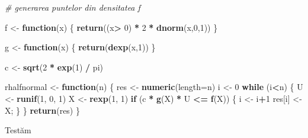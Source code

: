 \documentclass[]{article}
\newenvironment{Shaded}{\begin{snugshade}}{\end{snugshade}}
\newcommand{\CommentTok}[1]{\textcolor[rgb]{0.56,0.35,0.01}{\textit{#1}}}
\newcommand{\ControlFlowTok}[1]{\textcolor[rgb]{0.13,0.29,0.53}{\textbf{#1}}}
\newcommand{\DataTypeTok}[1]{\textcolor[rgb]{0.13,0.29,0.53}{#1}}
\newcommand{\DecValTok}[1]{\textcolor[rgb]{0.00,0.00,0.81}{#1}}
\newcommand{\KeywordTok}[1]{\textcolor[rgb]{0.13,0.29,0.53}{\textbf{#1}}}
\newcommand{\NormalTok}[1]{#1}
\newcommand{\OperatorTok}[1]{\textcolor[rgb]{0.81,0.36,0.00}{\textbf{#1}}}
\newcommand{\StringTok}[1]{\textcolor[rgb]{0.31,0.60,0.02}{#1}}
\begin{document}
\begin{Shaded}
\begin{Highlighting}[]
\CommentTok{# generarea puntelor din densitatea f}

\NormalTok{f <-}\StringTok{ }\ControlFlowTok{function}\NormalTok{(x) \{}
  \KeywordTok{return}\NormalTok{((x}\OperatorTok{>}\StringTok{ }\DecValTok{0}\NormalTok{) }\OperatorTok{*}\StringTok{ }\DecValTok{2} \OperatorTok{*}\StringTok{ }\KeywordTok{dnorm}\NormalTok{(x,}\DecValTok{0}\NormalTok{,}\DecValTok{1}\NormalTok{))}
\NormalTok{\}}

\NormalTok{g <-}\StringTok{ }\ControlFlowTok{function}\NormalTok{(x) \{ }\KeywordTok{return}\NormalTok{(}\KeywordTok{dexp}\NormalTok{(x,}\DecValTok{1}\NormalTok{)) \}}

\NormalTok{c <-}\StringTok{ }\KeywordTok{sqrt}\NormalTok{(}\DecValTok{2} \OperatorTok{*}\StringTok{ }\KeywordTok{exp}\NormalTok{(}\DecValTok{1}\NormalTok{) }\OperatorTok{/}\StringTok{ }\NormalTok{pi)}

\NormalTok{rhalfnormal <-}\StringTok{ }\ControlFlowTok{function}\NormalTok{(n) \{}
\NormalTok{  res <-}\StringTok{ }\KeywordTok{numeric}\NormalTok{(}\DataTypeTok{length=}\NormalTok{n)}
\NormalTok{  i <-}\StringTok{ }\DecValTok{0}
  \ControlFlowTok{while}\NormalTok{ (i}\OperatorTok{<}\NormalTok{n) \{}
\NormalTok{    U <-}\StringTok{ }\KeywordTok{runif}\NormalTok{(}\DecValTok{1}\NormalTok{, }\DecValTok{0}\NormalTok{, }\DecValTok{1}\NormalTok{)}
\NormalTok{    X <-}\StringTok{ }\KeywordTok{rexp}\NormalTok{(}\DecValTok{1}\NormalTok{, }\DecValTok{1}\NormalTok{)}
    \ControlFlowTok{if}\NormalTok{ (c }\OperatorTok{*}\StringTok{ }\KeywordTok{g}\NormalTok{(X) }\OperatorTok{*}\StringTok{ }\NormalTok{U }\OperatorTok{<=}\StringTok{ }\KeywordTok{f}\NormalTok{(X)) \{}
\NormalTok{      i <-}\StringTok{ }\NormalTok{i}\OperatorTok{+}\DecValTok{1}
\NormalTok{      res[i] <-}\StringTok{ }\NormalTok{X;}
\NormalTok{    \}}
\NormalTok{  \}}
  \KeywordTok{return}\NormalTok{(res)}
\NormalTok{\}}
\end{Highlighting}
\end{Shaded}

Testăm
\end{document}
